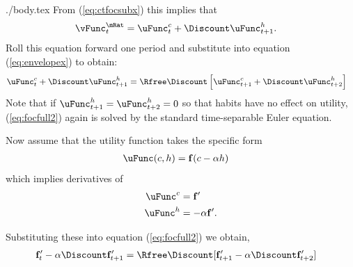 \documentclass{handout}
\begin{document}
\begin{verbatimwrite}{./body.tex}
From (\ref{eq:ctfocsubx}) this implies that
\begin{equation}\begin{gathered}\begin{aligned}
\vFunc_{t}^{\mRat} & =  \uFunc^{c}_{t}+\Discount \uFunc_{t+1}^{h}.
\end{aligned}\end{gathered}\end{equation}
Roll this equation forward one period and substitute into equation (\ref{eq:envelopex})
to obtain:
\begin{equation}\begin{gathered}\begin{aligned}
\uFunc^{c}_{t} + \Discount \uFunc_{t+1}^{h} & = 
\Rfree \Discount \left[\uFunc^{c}_{t+1}+\Discount \uFunc^{h}_{t+2}\right] \label{eq:focfull2}
\end{aligned}\end{gathered}\end{equation}
Note that if 
$\uFunc_{t+1}^{h}=\uFunc_{t+2}^{h}=0$ so that habits have no effect on 
utility, (\ref{eq:focfull2}) again is solved by the standard 
time-separable Euler equation.

Now assume that the utility function takes the specific form
\begin{equation}\begin{gathered}\begin{aligned}
        \uFunc(c,h) & =  \mathbf{f}(c-\alpha h)
\end{aligned}\end{gathered}\end{equation}
which implies derivatives of
\begin{equation}\begin{gathered}\begin{aligned}
        \uFunc^{c} & =  \mathbf{f}^{\prime}  \\
        \uFunc^{h} & =  -\alpha \mathbf{f}^{\prime}.
\end{aligned}\end{gathered}\end{equation}

Substituting these into equation (\ref{eq:focfull2}) we obtain, 
\begin{equation}\begin{gathered}\begin{aligned}
        \mathbf{f}_{t}^{\prime}-\alpha \Discount \mathbf{f}_{t+1}^{\prime} & =  \Rfree\Discount[\mathbf{f}_{t+1}^{\prime} -\alpha \Discount \mathbf{f}_{t+2}^{\prime}] \label{eq:vpeq}
\end{aligned}\end{gathered}\end{equation}


\end{verbatimwrite}
\end{document}
